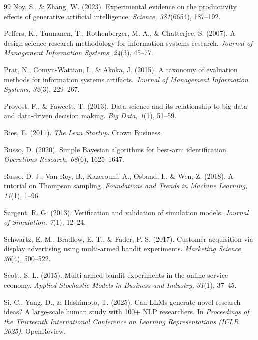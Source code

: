 \begin{thebibliography}{99}
 Noy, S., \& Zhang, W. (2023). Experimental evidence on the productivity effects of generative artificial intelligence. \textit{Science, 381}(6654), 187--192. 

 Peffers, K., Tuunanen, T., Rothenberger, M. A., \& Chatterjee, S. (2007). A design science research methodology for information systems research. \textit{Journal of Management Information Systems, 24}(3), 45--77. 

 Prat, N., Comyn-Wattiau, I., \& Akoka, J. (2015). A taxonomy of evaluation methods for information systems artifacts. \textit{Journal of Management Information Systems, 32}(3), 229--267. 

 Provost, F., \& Fawcett, T. (2013). Data science and its relationship to big data and data-driven decision making. \textit{Big Data, 1}(1), 51--59. 

 Ries, E. (2011). \textit{The Lean Startup}. Crown Business.

 Russo, D. (2020). Simple Bayesian algorithms for best-arm identification. \textit{Operations Research, 68}(6), 1625--1647. 

 Russo, D. J., Van Roy, B., Kazerouni, A., Osband, I., \& Wen, Z. (2018). A tutorial on Thompson sampling. \textit{Foundations and Trends in Machine Learning, 11}(1), 1--96. 

 Sargent, R. G. (2013). Verification and validation of simulation models. \textit{Journal of Simulation, 7}(1), 12--24. 

 Schwartz, E. M., Bradlow, E. T., \& Fader, P. S. (2017). Customer acquisition via display advertising using multi-armed bandit experiments. \textit{Marketing Science, 36}(4), 500--522. 

 Scott, S. L. (2015). Multi-armed bandit experiments in the online service economy. \textit{Applied Stochastic Models in Business and Industry, 31}(1), 37--45. 

 Si, C., Yang, D., \& Hashimoto, T. (2025). Can LLMs generate novel research ideas? A large-scale human study with 100+ NLP researchers. In \textit{Proceedings of the Thirteenth International Conference on Learning Representations (ICLR 2025)}. OpenReview.


\end{thebibliography}
